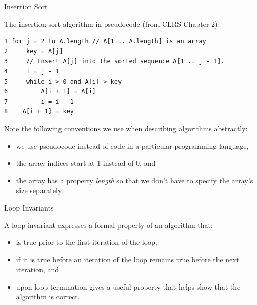 \documentclass{beamer}
\begin{document}
\begin{frame}[fragile]{Insertion Sort}


The insertion sort algorithm in pseudocode (from CLRS Chapter 2):
\vspace{-.05in}
\begin{lstlisting}[]
1 for j = 2 to A.length // A[1 .. A.length] is an array
2     key = A[j]
3     // Insert A[j] into the sorted sequence A[1 .. j - 1].
4     i = j - 1
5     while i > 0 and A[i] > key
6         A[i + 1] = A[i]
7         i = i - 1
8    A[i + 1] = key
\end{lstlisting}

Note the following conventions we use when describing algorithms abstractly:
\begin{itemize}
\item we use pseudocode instead of code in a particular programming language,
\item the array indices start at 1 instead of 0, and
\item the array has a property {\it length} so that we don't have to specify the array's size separately.
\end{itemize}

\end{frame}

\begin{frame}[fragile]{Loop Invariants}


A loop invariant expresses a formal property of an algorithm that:
\begin{itemize}
\item is true prior to the first iteration of the loop,
\item if it is true before an iteration of the loop remains true before the next iteration, and
\item upon loop termination gives a useful property that helps show that the algorithm is correct.
\end{itemize}


\end{frame}
\end{document}
